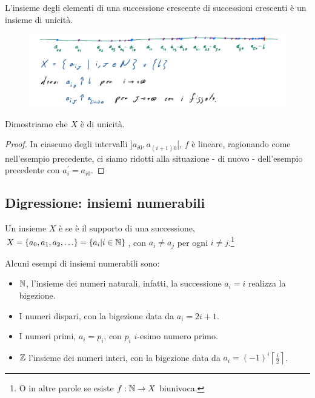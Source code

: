\begin{examplebb}
L'insieme degli elementi di una successione crescente di successioni crescenti è un insieme di unicità.
\end{examplebb}

	\begin{figure}[H]
		\centering
		\includegraphics[width=12.5cm]{immagini/succunic2.png}
	\end{figure}

Dimostriamo che $X$ è di unicità.
\begin{proof}
In ciascuno degli intervalli $]a_{i0}, a_{(i+1)0}[$, $f$ è lineare, ragionando come nell'esempio precedente, ci siamo ridotti alla situazione
- di nuovo - dell'esempio precedente con $a_i^{\prime} = a_{i0}$.
\end{proof}

\subsection{Digressione: insiemi numerabili}
\begin{definition}
	Un insieme $X$ è  se è il supporto di una successione, $X = \{a_0,a_1,a_2,\ldots\} = \{a_i | i \in \mathbb N\}$, con $a_i \ne a_j$ per ogni $i \ne j$.\footnote{O in altre parole se esiste $f : \mathbb N \to X$ biunivoca.}
\end{definition}

\begin{example}
	Alcuni esempi di insiemi numerabili sono:
	\begin{itemize}
		\item $\mathbb N$, l'insieme dei numeri naturali, infatti, la successione $a_i = i$ realizza la bigezione.
		\item I numeri dispari, con la bigezione data da $a_i = 2i + 1$.
		\item I numeri primi, $a_i = p_i$, con $p_i$ $i$-esimo numero primo.
		\item $\mathbb Z$ l'insieme dei numeri interi, con la bigezione data da $a_i =  (-1)^i \left\lceil\frac{i}{2}\right\rceil$.
	\end{itemize}
\end{example}

